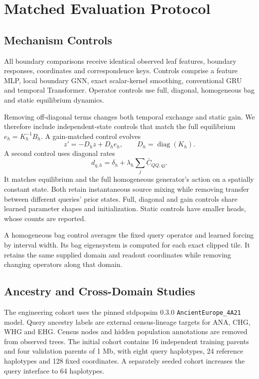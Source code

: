 \documentclass[letterpaper]{article}
\begin{document}
\section{Matched Evaluation Protocol}
\subsection{Mechanism Controls}
All boundary comparisons receive identical observed leaf features, boundary responses, coordinates and correspondence keys. Controls comprise a feature MLP, local boundary GNN, exact scalar-kernel smoothing, conventional GRU and temporal Transformer. Operator controls use full, diagonal, homogeneous bag and static equilibrium dynamics.

Removing off-diagonal terms changes both temporal exchange and static gain. We therefore include independent-state controls that match the full equilibrium $e_h=K_h^{-1}B_h$. A gain-matched control evolves
\begin{equation}
 z'=-D_hz+D_he_h,\qquad D_h=\operatorname{diag}(K_h).
\end{equation}
A second control uses diagonal rates
\begin{equation}
 d_{q,h}=\delta_h+\lambda_h\sum_j\bar C_{QQ,qj}.
\end{equation}
It matches equilibrium and the full homogeneous generator's action on a spatially constant state. Both retain instantaneous source mixing while removing transfer between different queries' prior states. Full, diagonal and gain controls share learned parameter shapes and initialization. Static controls have smaller heads, whose counts are reported.

A homogeneous bag control averages the fixed query operator and learned forcing by interval width. Its bag eigensystem is computed for each exact clipped tile. It retains the same supplied domain and readout coordinates while removing changing operators along that domain.

\subsection{Ancestry and Cross-Domain Studies}
The engineering cohort uses the pinned stdpopsim 0.3.0 \texttt{AncientEurope\_4A21} model. Query ancestry labels are external census-lineage targets for ANA, CHG, WHG and EHG. Census nodes and hidden population annotations are removed from observed trees. The initial cohort contains 16 independent training parents and four validation parents of 1 Mb, with eight query haplotypes, 24 reference haplotypes and 128 fixed coordinates. A separately seeded cohort increases the query interface to 64 haplotypes.
\end{document}
